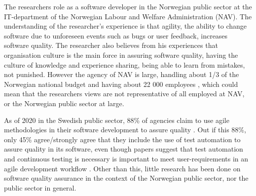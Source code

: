 The researchers role as a software developer in the Norwegian public sector at the IT-department of the Norwegian Labour and Welfare Administration (NAV). The understanding of the researcher's experience is that agility, the ability to change software due to unforeseen events such as bugs or user feedback, increases software quality. The researcher also believes from his experiences that organisation culture is the main force in assuring software quality, having the culture of knowledge and experience sharing, being able to learn from mistakes, not punished. However the agency of NAV is large, handling about 1/3 of the Norwegian national budget \cite{okp_nav_r_2022}\cite{bud_r_2021} and having about 22 000 employees \cite{org_nav_2023}, which could mean that the researchers views are not representative of all employed at NAV, or the Norwegian public sector at large.

As of 2020 in the Swedish public sector, 88\% of agencies claim to use agile methodologies in their software development to assure quality \cite{mb_2020}. Out if this 88\%, only 45\% agree/strongly agree that they include the use of test automation to assure quality in its software, even though papers suggest that test automation and continuous testing is necessary is important to meet user-requirements in an agile development workflow \cite{vk_2010}. Other than this, little research has been done on software quality assurance in the context of the Norwegian public sector, nor the public sector in general. 



